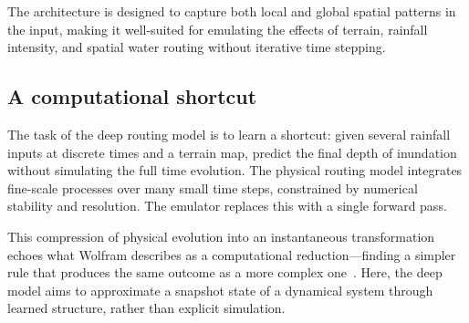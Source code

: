 \documentclass{article}
\begin{document}
The architecture is designed to capture both local and global spatial patterns in the input, making it well-suited for emulating the effects of terrain, rainfall intensity, and spatial water routing without iterative time stepping.

\subsection{A computational shortcut}
\label{sec:comp}

The task of the deep routing model is to learn a shortcut: given several rainfall inputs at discrete times and a terrain map, predict the final depth of inundation without simulating the full time evolution. The physical routing model integrates fine-scale processes over many small time steps, constrained by numerical stability and resolution. The emulator replaces this with a single forward pass.

This compression of physical evolution into an instantaneous transformation echoes what Wolfram describes as a computational reduction—finding a simpler rule that produces the same outcome as a more complex one~\cite{wolfram2023second}. Here, the deep model aims to approximate a snapshot state of a dynamical system through learned structure, rather than explicit simulation.

  
  
\end{document}
